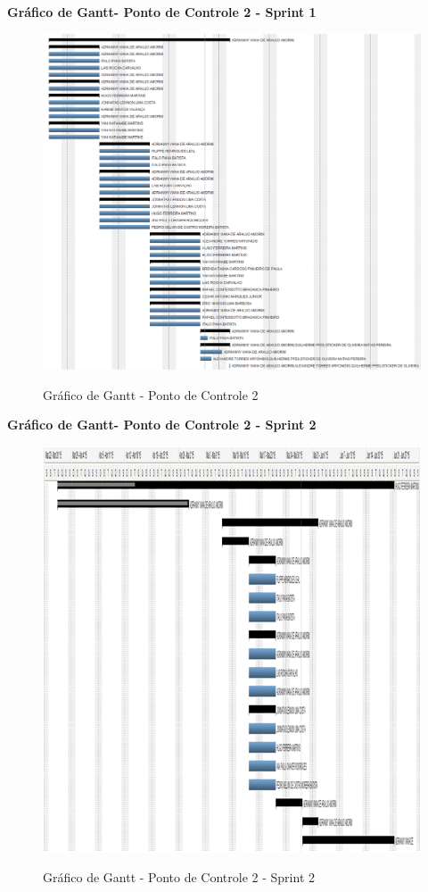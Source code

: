   \pagebreak
  \textbf{Gráfico de Gantt- Ponto de Controle 2 - Sprint 1}
   \begin{figure}[!h]
    \centering
    \includegraphics[scale = 0.4]{editaveis/figuras/ganttPC2}
    \label{Gráfico de Gantt PC2}
    \caption{Gráfico de Gantt - Ponto de Controle 2}
   \end{figure}
   \FloatBarrier
   
    \pagebreak
  \textbf{Gráfico de Gantt- Ponto de Controle 2 - Sprint 2}
   \begin{figure}[!h]
    \centering
    \includegraphics[scale = 0.9]{editaveis/figuras/ganttPC2S2}
    \label{Gráfico de Gantt PC2S2}
    \caption{Gráfico de Gantt - Ponto de Controle 2 - Sprint 2}
   \end{figure}
   \FloatBarrier
   
